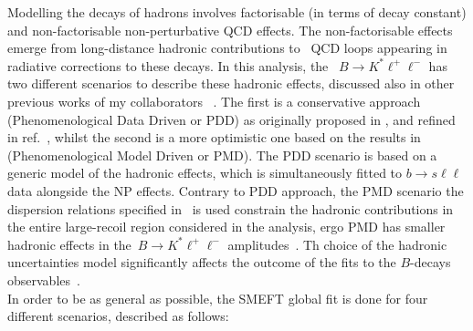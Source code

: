 Modelling the decays of hadrons involves factorisable (in terms of decay constant) and non-factorisable non-perturbative QCD effects. The non-factorisable effects emerge from long-distance hadronic contributions to~\cite{Khodjamirian:2010vf,Jager:2014rwa,Lyon:2014hpa} QCD loops appearing in radiative corrections to these decays. In this analysis, the ~$B\to K^*\ell^+\ell^-$ has two different scenarios to describe these hadronic effects, discussed also in other previous works of my collaborators ~\cite{Ciuchini:2016weo,Ciuchini:2017mik,Ciuchini:2017gva,Ciuchini:2018xll,Ciuchini:2018anp,Ciuchini:2019usw}. The first is a conservative approach (Phenomenological Data Driven or PDD) as originally proposed in \cite{Ciuchini:2015qxb}, and refined in ref.~\cite{Ciuchini:2018anp}, whilst the second is a more optimistic one based on the results in~\cite{Khodjamirian:2010vf} (Phenomenological Model Driven or PMD). The PDD scenario is based on a generic model of the hadronic effects, which is simultaneously fitted to $b \to s \ell \ell$ data alongside the NP effects. Contrary to PDD approach, the PMD scenario the dispersion relations specified in~\cite{Khodjamirian:2010vf} is used constrain the hadronic contributions in the entire large-recoil region considered in the analysis, ergo PMD has smaller hadronic effects in the~$B\to K^*\ell^+\ell^-$ amplitudes~\cite{Ciuchini:2016weo}. Th choice of the hadronic uncertainties model significantly affects the outcome of the  fits to the $B$-decays observables~\cite{Ciuchini:2019usw}. \\ In order to be as general as possible, the SMEFT global fit is done for four different scenarios, described as follows:
